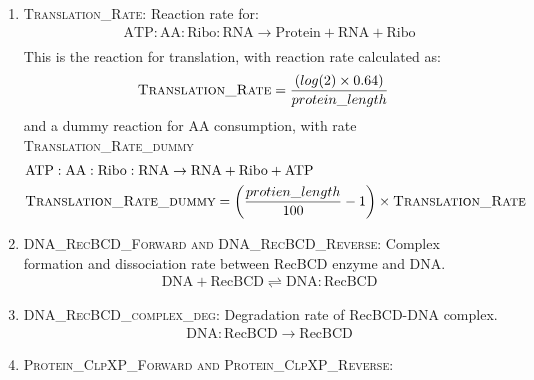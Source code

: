 \documentclass[english]{report}
\begin{document}
\begin{enumerate}
        	\item \textsc{Translation\_Rate}: Reaction rate for: \\
        	\begin{align}
        	& \mathrm{ATP:AA:Ribo:RNA}  \rightarrow \mathrm{Protein} + \mathrm{RNA} + \mathrm{Ribo}\\
        	\end{align}
        	This is the reaction for translation, with reaction rate calculated as:\\
        	\begin{align}
        	& \textsc{Translation\_Rate} = \frac{(log(2)\times0.64)}{protein\_length}\\
        	\end{align}
        	\textrm{and a dummy reaction for AA consumption, with rate \textsc{Translation\_Rate\_dummy}} \\
        	\begin{align}
        	&\mathrm{ATP:AA:Ribo:RNA}  \rightarrow \mathrm{RNA} + \mathrm{Ribo} + \mathrm{ATP}\\
        	& \textsc{Translation\_Rate\_dummy} = \left(\frac{protien\_length}{100}-1\right)\times\textsc{Translation\_Rate}
        	\end{align}
        	
        	\item \textsc{DNA\_RecBCD\_Forward and DNA\_RecBCD\_Reverse}:
        	Complex formation and dissociation rate between RecBCD enzyme and DNA.        	
        	\begin{align}
        	& \mathrm{DNA} + \mathrm{RecBCD}  \rightleftharpoons \mathrm{DNA:RecBCD}
        	\end{align}
        	
        	
        	\item \textsc{DNA\_RecBCD\_complex\_deg}: 
        	Degradation rate of RecBCD-DNA complex. 
        	\begin{align}
        	& \mathrm{DNA:RecBCD} \rightarrow  \mathrm{RecBCD} 
        	\end{align}
        	
        	\item \textsc{Protein\_ClpXP\_Forward and Protein\_ClpXP\_Reverse}: 
        	

\end{enumerate}
\end{document}
